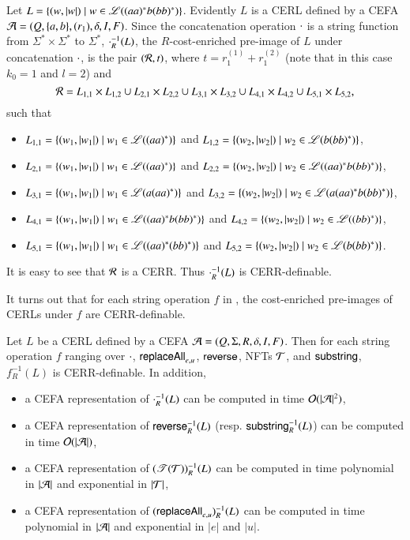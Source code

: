 \begin{example}\label{exm:pre-image}
Let $L = \{(w, |w|) \mid w \in \mathscr{L}((aa)^*b(bb)^*) \}$. Evidently $L$  is a CERL defined by a CEFA $\mathcal{A} = (Q, \{a,b\}, (r_1), \delta, I, F)$. Since the concatenation operation $\cdot$  is a string function from $\Sigma^* \times \Sigma^*$ to $\Sigma^*$, $\cdot^{-1}_R(L)$, the $R$-cost-enriched pre-image of $L$ under concatenation $\cdot$, is the pair $(\mathcal{R}, t)$, where $t=r^{(1)}_1+r^{(2)}_1$ (note that in this case $k_0=1$ and $l=2$) and 
\[\mathcal{R} = L_{1,1} \times L_{1,2} \cup L_{2,1} \times L_{2,2} \cup L_{3,1} \times L_{3,2} \cup L_{4,1} \times L_{4,2} \cup L_{5,1} \times L_{5,2},\]
such that
\begin{itemize}
\item $L_{1,1} = \{(w_1, |w_1|) \mid w_1 \in \mathscr{L}((aa)^*)\}$ and $L_{1,2} = \{(w_2, |w_2|) \mid w_2 \in \mathscr{L}(b(bb)^*)\}$,
%
\item $L_{2,1} = \{(w_1, |w_1|) \mid w_1 \in \mathscr{L}((aa)^*)\}$ and $L_{2,2} = \{(w_2, |w_2|) \mid w_2 \in \mathscr{L}((aa)^*b(bb)^*)\}$,
%
\item $L_{3,1} = \{(w_1, |w_1|) \mid w_1 \in \mathscr{L}(a(aa)^*)\}$ and $L_{3,2} = \{(w_2, |w_2|) \mid w_2 \in \mathscr{L}(a(aa)^*b(bb)^*)\}$,
%
\item $L_{4,1} = \{(w_1, |w_1|) \mid w_1 \in \mathscr{L}((aa)^*b(bb)^*)\}$ and $L_{4,2} = \{(w_2, |w_2|) \mid w_2 \in \mathscr{L}((bb)^*)\}$,
%
\item $L_{5,1} = \{(w_1, |w_1|) \mid w_1 \in \mathscr{L}((aa)^*(bb)^*)\}$ and $L_{5,2} = \{(w_2, |w_2|) \mid w_2 \in \mathscr{L}(b(bb)^*)\}$.
\end{itemize}
It is easy to see that $\mathcal{R}$ is a CERR. Thus $\cdot^{-1}_R(L)$ is CERR-definable.
\end{example}

It turns out that for each string operation $f$ in {\slint}, the cost-enriched pre-images of CERLs under $f$ are CERR-definable.

\begin{proposition}\label{prop:pre-image}
Let $L$ be a CERL defined by a CEFA $\mathcal{A} = (Q, \Sigma, R, \delta, I, F)$. Then for each string operation $f$ ranging over $\cdot$, $\mathsf{replaceAll}_{e,u}$, $\mathsf{reverse}$, NFTs $\mathcal{T}$, and $\mathsf{substring}$, $f^{-1}_R(L)$ is CERR-definable. In addition,
\begin{itemize}
\item a CEFA representation of $\cdot^{-1}_R(L)$ can be computed in time $\mathcal{O}(|\mathcal{A}|^2)$, 
%
\item a CEFA representation of $\mathsf{reverse}^{-1}_R(L)$ (resp. $\mathsf{substring}^{-1}_R(L)$) can be computed in time $\mathcal{O}(|\mathcal{A}|)$,
%
\item a CEFA representation of  $(\mathscr{T}(\mathcal{T}))^{-1}_R(L)$ can be computed in time polynomial in $|\mathcal{A}|$ and exponential in $|\mathcal{T}|$,
%
\item a CEFA representation of  $(\mathsf{replaceAll}_{e,u})^{-1}_R(L)$ can be computed in time polynomial in $|\mathcal{A}|$ and exponential in $|e|$ and $|u|$.
\end{itemize}
\end{proposition}

